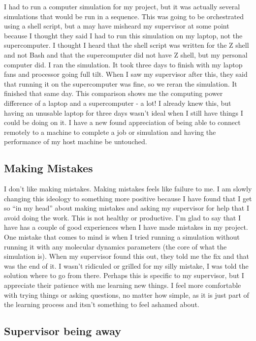 \documentclass[11pt]{article}
\begin{document}
I had to run a computer simulation for my project, but it was actually several simulations that would be run in a sequence. This was going to be orchestrated using a shell script, but a may have misheard my supervisor at some point because I thought they said I had to run this simulation on my laptop, not the supercomputer. I thought I heard that the shell script was written for the Z shell and not Bash and that the supercomputer did not have Z shell, but my personal computer did. I ran the simulation. It took three days to finish with my laptop fans and processor going full tilt. When I saw my supervisor after this, they said that running it on the supercomputer was fine, so we reran the simulation. It finished that same day. This comparison shows me the computing power difference of a laptop and a supercomputer - a lot! I already knew this, but having an unusable laptop for three days wasn't ideal when I still have things I could be doing on it. I have a new found appreciation of being able to connect remotely to a machine to complete a job or simulation and having the performance of my host machine be untouched.

\subsection{Making Mistakes}

I don't like making mistakes. Making mistakes feels like failure to me. I am slowly changing this ideology to something more positive because I have found that I get so ``in my head'' about making mistakes and asking my supervisor for help that I avoid doing the work. This is not healthy or productive. I'm glad to say that I have has a couple of good experiences when I have made mistakes in my project. One mistake that comes to mind is when I tried running a simulation without running it with any molecular dynamics parameters (the core of what the simulation is). When my supervisor found this out, they told me the fix and that was the end of it. I wasn't ridiculed or grilled for my silly mistake, I was told the solution where to go from there. Perhaps this is specific to my supervisor, but I appreciate their patience with me learning new things. I feel more comfortable with trying things or asking questions, no matter how simple, as it is just part of the learning process and itsn't something to feel ashamed about.

\subsection{Supervisor being away}
\end{document}
